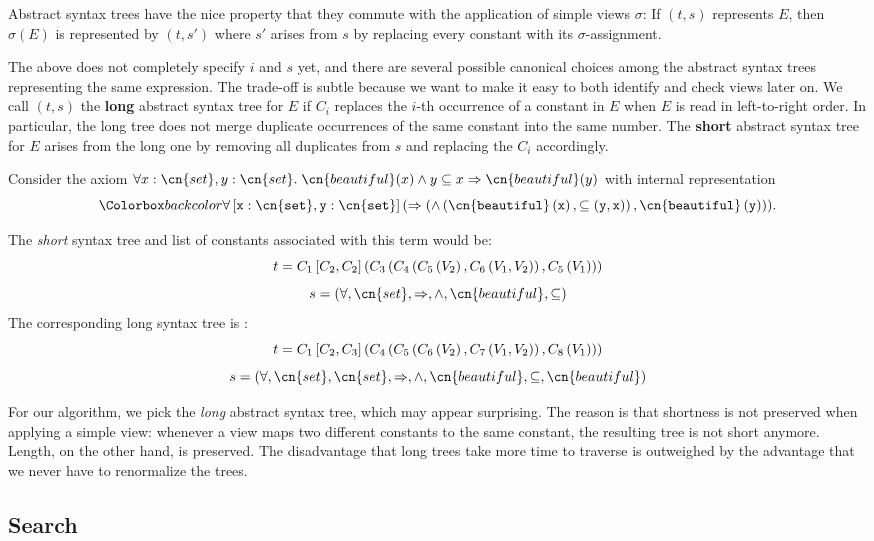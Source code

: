 Abstract syntax trees have the nice property that they commute with the application of simple views $\sigma$:
If $(t,s)$ represents $E$, then $\sigma(E)$ is represented by $(t,s')$ where $s'$ arises from $s$ by replacing every constant with its $\sigma$-assignment.

The above does not completely specify $i$ and $s$ yet, and there are several possible canonical choices among the abstract syntax trees representing the same expression.
The trade-off is subtle because we want to make it easy to both identify and check views later on.
We call $(t,s)$ the \textbf{long} abstract syntax tree for $E$ if $C_i$ replaces the $i$-th occurrence of a constant in $E$ when $E$ is read in left-to-right order.
In particular, the long tree does not merge duplicate occurrences of the same constant into the same number.
The \textbf{short} abstract syntax tree for $E$ arises from the long one by removing all duplicates from $s$ and replacing the $C_i$ accordingly.

\begin{example}
Consider the axiom $\forall x:\cn{set},y:\cn{set}.\; \cn{beautiful}(x) \wedge y \subseteq x \Rightarrow \cn{beautiful}(y)$ with internal representation \[\expr{\ombind{\forall}{x:\cn{set},y:\cn{set}}{\oma{\Rightarrow}{\oma{\wedge}{\oma{\cn{beautiful}}{x},\oma{\subseteq}{y,x}},\oma{\cn{beautiful}}{y}}}}.\]

The \emph{short} syntax tree and list of constants associated with this term would be:
\[t=C_1\left[C_2,C_2\right]\left(C_3\left(C_4\left(C_5\left(V_2\right),C_6\left(V_1,V_2\right)\right),C_5\left(V_1\right)\right)\right)\] 
\[s=(\forall,\cn{set},\Rightarrow,\wedge,\cn{beautiful},\subseteq)\]
The corresponding long syntax tree is :
\[t=C_1\left[C_2,C_3\right]\left(C_4\left(C_5\left(C_6\left(V_2\right),C_7\left(V_1,V_2\right)\right),C_8\left(V_1\right)\right)\right)\]
\[ s=(\forall,\cn{set},\cn{set},\Rightarrow,\wedge,\cn{beautiful},\subseteq,\cn{beautiful})\]
\end{example}

For our algorithm, we pick the \emph{long} abstract syntax tree, which may appear surprising.
The reason is that shortness is not preserved when applying a simple view: whenever a view maps two different constants to the same constant, the resulting tree is not short anymore.
Length, on the other hand, is preserved.
The disadvantage that long trees take more time to traverse is outweighed by the advantage that we never have to renormalize the trees.

\subsection{Search}

